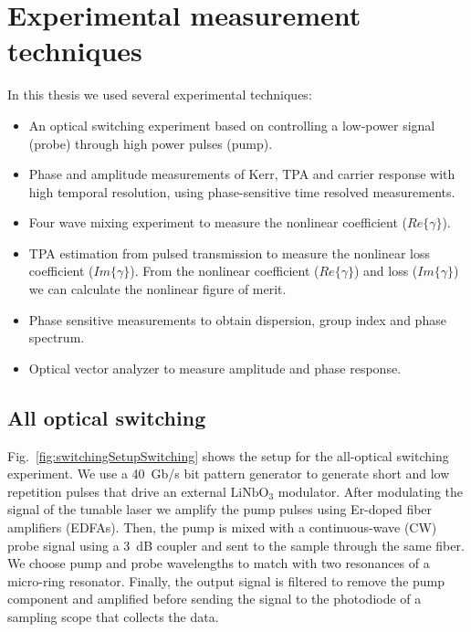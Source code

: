 \pagestyle{fancy}
\lhead{}
\renewcommand{\chaptermark}[1]{\markboth{\thechapter.\ #1}{}}
\chapter{Experimental measurement techniques}
\label{ch:experimentalSetups}

In this thesis we used several experimental techniques:

\begin{itemize}
  \item An optical switching experiment based on controlling a low-power signal (probe) through high power pulses (pump).
  \item Phase and amplitude measurements of Kerr, TPA and carrier response with high temporal resolution, using phase-sensitive time resolved measurements.
  \item Four wave mixing experiment to measure the nonlinear coefficient ($Re\{\gamma\}$).
  \item TPA estimation from pulsed transmission to measure the nonlinear loss coefficient ($Im\{\gamma\}$). From the nonlinear coefficient ($Re\{\gamma\}$) and loss ($Im\{\gamma\}$) we can calculate the nonlinear figure of merit.
  \item Phase sensitive measurements to obtain dispersion, group index and phase spectrum.
  \item Optical vector analyzer to measure amplitude and phase response.
\end{itemize}

\section{All optical switching}
\label{ch:allOpticalSwitching}
Fig.~\ref{fig:switchingSetupSwitching} shows the setup for the all-optical switching experiment.
We use a 40~Gb/s bit pattern generator to generate short and low repetition pulses that drive an external $ \mathrm{LiNbO_3} $ modulator.
After modulating the signal of the tunable laser we amplify the pump pulses using Er-doped fiber amplifiers (EDFAs).
Then, the pump is mixed with a continuous-wave (CW) probe signal using a 3~dB coupler and sent to the sample through the same fiber.
We choose pump and probe wavelengths to match with two resonances of a micro-ring resonator.
Finally, the output signal is filtered to remove the pump component and amplified before sending the signal to the photodiode of a sampling scope that collects the data.

